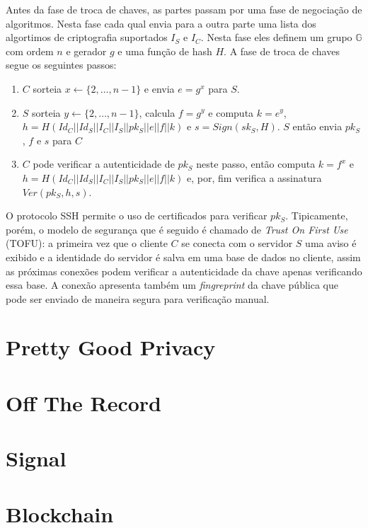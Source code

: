 Antes da fase de troca de chaves, as partes passam por uma fase de negociação de algoritmos.
Nesta fase cada qual envia para a outra parte uma lista dos algortimos de criptografia suportados $I_S$ e $I_C$.
Nesta fase eles definem um grupo $\mathbb{G}$ com ordem $n$ e gerador $g$ e uma função de hash $H$.
A fase de troca de chaves segue os seguintes passos:
\begin{enumerate}
\item $C$ sorteia $x \leftarrow \{2, \dots, n-1\}$ e envia $e = g^x$ para $S$.
\item $S$ sorteia $y \leftarrow \{2, \dots, n-1\}$, calcula $f = g^y$ e computa $k = e^y$, $h = H(Id_C || Id_S || I_C || I_S || pk_S || e || f || k)$ e $s = Sign(sk_S, H)$.
$S$ então envia $pk_S$, $f$ e $s$ para $C$
\item $C$ pode verificar a autenticidade de $pk_S$ neste passo, então computa $k = f^x$ e $h = H(Id_C || Id_S || I_C || I_S || pk_S || e || f || k)$ e, por, fim verifica a assinatura $Ver(pk_S, h, s)$.
\end{enumerate}

O protocolo SSH permite o uso de certificados para verificar $pk_S$.
Tipicamente, porém, o modelo de segurança que é seguido é chamado de {\em Trust On First Use} (TOFU): a primeira vez que o cliente $C$ se conecta com o servidor $S$ uma aviso é exibido e a identidade do servidor é salva em uma base de dados no cliente, assim as próximas conexões podem verificar a autenticidade da chave apenas verificando essa base.
A conexão apresenta também um {\em fingreprint} da chave pública que pode ser enviado de maneira segura para verificação manual.

\section{Pretty Good Privacy}
\label{sec:pgp}

\section{Off The Record}
\label{sec:otr}

\section{Signal}
\label{sec:signal}


\section{Blockchain}
\label{sec:blockchain}


